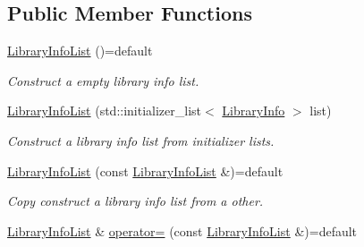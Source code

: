 \subsection*{Public Member Functions}
\begin{DoxyCompactItemize}
\item 
\hyperlink{class_mdt_1_1_deploy_utils_1_1_library_info_list_a3157bd9fc09a3472c1a0e2e615d619ea}{Library\+Info\+List} ()=default\hypertarget{class_mdt_1_1_deploy_utils_1_1_library_info_list_a3157bd9fc09a3472c1a0e2e615d619ea}{}\label{class_mdt_1_1_deploy_utils_1_1_library_info_list_a3157bd9fc09a3472c1a0e2e615d619ea}

\begin{DoxyCompactList}\small\item\em Construct a empty library info list. \end{DoxyCompactList}\item 
\hyperlink{class_mdt_1_1_deploy_utils_1_1_library_info_list_ad7855d64a98e84a8ae1cf71acf03dbc4}{Library\+Info\+List} (std\+::initializer\+\_\+list$<$ \hyperlink{class_mdt_1_1_deploy_utils_1_1_library_info}{Library\+Info} $>$ list)\hypertarget{class_mdt_1_1_deploy_utils_1_1_library_info_list_ad7855d64a98e84a8ae1cf71acf03dbc4}{}\label{class_mdt_1_1_deploy_utils_1_1_library_info_list_ad7855d64a98e84a8ae1cf71acf03dbc4}

\begin{DoxyCompactList}\small\item\em Construct a library info list from initializer lists. \end{DoxyCompactList}\item 
\hyperlink{class_mdt_1_1_deploy_utils_1_1_library_info_list_ab96b187fdc2f20b37aee8786018a4675}{Library\+Info\+List} (const \hyperlink{class_mdt_1_1_deploy_utils_1_1_library_info_list}{Library\+Info\+List} \&)=default\hypertarget{class_mdt_1_1_deploy_utils_1_1_library_info_list_ab96b187fdc2f20b37aee8786018a4675}{}\label{class_mdt_1_1_deploy_utils_1_1_library_info_list_ab96b187fdc2f20b37aee8786018a4675}

\begin{DoxyCompactList}\small\item\em Copy construct a library info list from a other. \end{DoxyCompactList}\item 
\hyperlink{class_mdt_1_1_deploy_utils_1_1_library_info_list}{Library\+Info\+List} \& \hyperlink{class_mdt_1_1_deploy_utils_1_1_library_info_list_a3f6c7292e77383705324a45b26c2240f}{operator=} (const \hyperlink{class_mdt_1_1_deploy_utils_1_1_library_info_list}{Library\+Info\+List} \&)=default\hypertarget{class_mdt_1_1_deploy_utils_1_1_library_info_list_a3f6c7292e77383705324a45b26c2240f}{}\label{class_mdt_1_1_deploy_utils_1_1_library_info_list_a3f6c7292e77383705324a45b26c2240f}


\end{DoxyCompactItemize}
